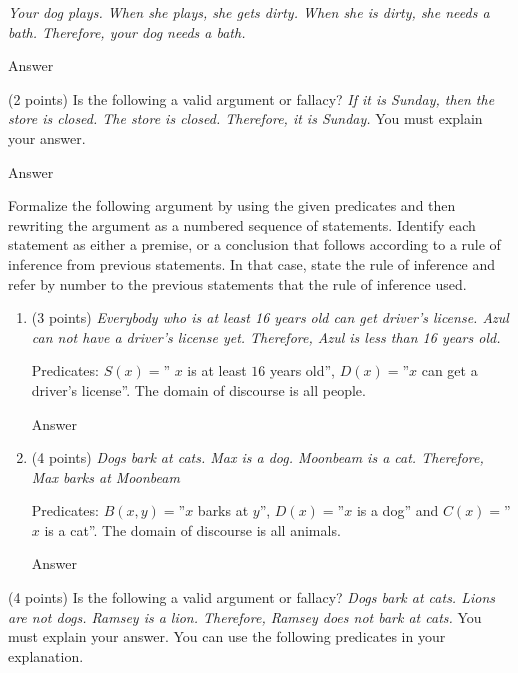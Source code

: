 \documentclass{article}
\begin{document}
\begin{enumerate}
    \textit{Your dog plays. When she plays, she gets dirty. When she is dirty, she needs a bath. Therefore, your dog needs a bath.}
    
    \color{blue}
        Answer
    \color{black}
    
    \item (2 points) Is the following a valid argument or fallacy? \textit{If it is Sunday, then the store is closed. The store is closed. Therefore, it is Sunday.} You must explain your answer.

    \color{blue}
        Answer
    \color{black}
    
    \item Formalize the following argument by using the given predicates and then rewriting the argument as a numbered sequence of statements. Identify each statement as either a premise, or a conclusion that follows according to a rule of inference from previous statements. In that case, state the rule of inference and refer by number to the previous statements that the rule of inference used.
    \begin{enumerate}
        \setlength{\parskip}{\baselineskip}
        \item (3 points) \textit{Everybody who is at least 16 years old can get driver’s license. Azul can not have a driver’s license yet. Therefore, Azul is less than 16 years old.}
    
        Predicates: $S(x)=$” $x$ is at least $16$ years old”, $D(x)=$”$x$ can get a driver’s license”. The domain of discourse is all people.

        \color{blue}
            Answer
        \color{black}
    
        \item (4 points) \textit{Dogs bark at cats. Max is a dog. Moonbeam is a cat. Therefore, Max barks at Moonbeam}

        Predicates: $B(x,y)=$”$x$ barks at $y$”, $D(x)=$”$x$ is a dog” and $C(x)=$”\\$x$ is a cat”. The domain of discourse is all animals.
        
        \color{blue}
            Answer
        \color{black}
    
    \end{enumerate}
    
    {\setlength{\parskip}{\baselineskip}
    \item (4 points) Is the following a valid argument or fallacy? \textit{Dogs bark at cats. Lions are not dogs. Ramsey is a lion. Therefore, Ramsey does not bark at cats.} You must explain your answer. You can use the following predicates in your explanation.

}
\end{enumerate}
\end{document}
